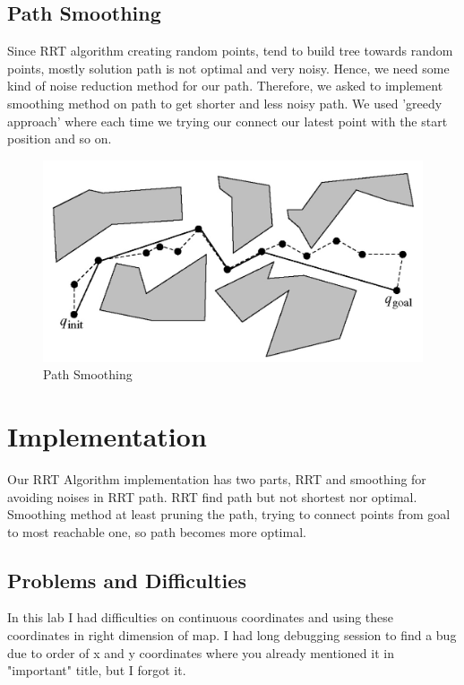 \documentclass{article}
\begin{document}
	\subsection{Path Smoothing}
	Since RRT algorithm creating random points, tend to build tree towards random points, mostly solution path is not optimal and very noisy. Hence, we need some kind of noise reduction method for our path. Therefore, we asked to implement smoothing method on path to get shorter and less noisy path. We used 'greedy approach' where each time we trying our connect our latest point with the start position and so on. 
	
\begin{figure}[H]
\begin{center}
\includegraphics[scale=0.1]{rrtSmoothing.png}
\caption{Path Smoothing}
\end{center}
\end{figure}	
	
\section{Implementation}

Our RRT Algorithm implementation has two parts, RRT and smoothing for avoiding noises in RRT path. RRT find path but not shortest nor optimal. Smoothing method at least pruning the path, trying to connect points from goal to most reachable one, so path becomes more optimal.

	\subsection{Problems and Difficulties}
	In this lab I had difficulties on continuous coordinates and using these coordinates in right dimension of map. I had long debugging session to find a bug due to order of x and y coordinates where you already mentioned it in "important" title, but I forgot it.
	
\end{document}
